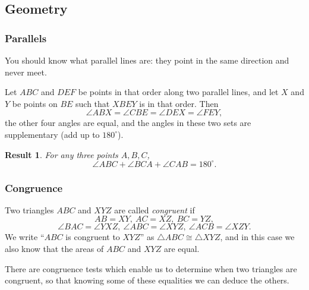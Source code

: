 \documentclass{amsart}
\newtheorem{result}{Result}[subsubsection]
\begin{document}
\subsection{Geometry}
\subsubsection{Parallels}
You should know what parallel lines are: they point in the same direction and
never meet.

Let $ABC$ and $DEF$ be points in that order along two parallel lines, and let
$X$ and $Y$ be points on $BE$ such that $XBEY$ is in that order.
Then
\[\angle ABX=\angle CBE=\angle DEX=\angle FEY,\] the other four angles are
equal, and the angles in these two sets are supplementary (add up to 
$180^\circ$).
\begin{result}{\label{r:b:g:p:1}}
  For any three points $A, B, C$, \[\angle ABC+\angle
  BCA+\angle CAB=180^\circ.\]
\end{result}
\subsubsection{Congruence}
Two triangles $ABC$ and $XYZ$ are called \emph{congruent} if \[AB=XY,\ AC=XZ,\
BC=YZ,\]
\[\angle BAC=\angle YXZ,\ \angle ABC=\angle XYZ,\ \angle ACB=\angle
XZY.\]
We write ``$ABC$ is congruent to $XYZ$'' as $\triangle ABC\cong\triangle XYZ$,
and in this case we also know that the areas of $ABC$ and $XYZ$ are equal.

There are congruence tests which enable us to determine when two triangles are
congruent, so that knowing some of these equalities we can deduce the others.
\end{document}
